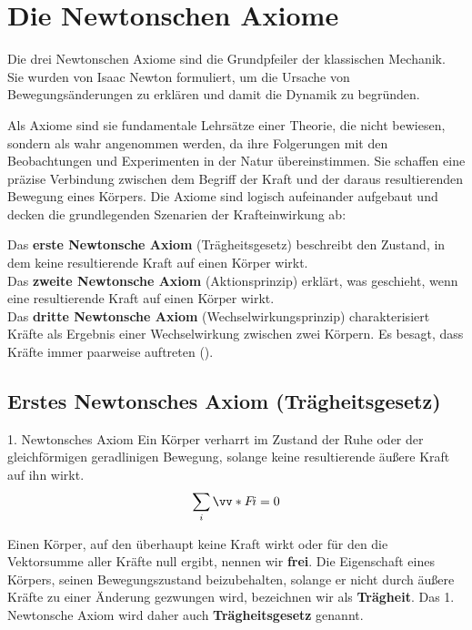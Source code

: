 \section{Die Newtonschen Axiome}\label{sec: newtonsche_axiome}
Die drei Newtonschen Axiome sind die Grundpfeiler der klassischen Mechanik. Sie wurden von Isaac Newton formuliert, um die Ursache von Bewegungsänderungen zu erklären und damit die Dynamik zu begründen. 

Als Axiome sind sie fundamentale Lehrsätze einer Theorie, die nicht bewiesen, sondern als wahr angenommen werden, da ihre Folgerungen mit den Beobachtungen und Experimenten in der Natur übereinstimmen. Sie schaffen eine präzise Verbindung zwischen dem Begriff der Kraft und der daraus resultierenden Bewegung eines Körpers. Die Axiome sind logisch aufeinander aufgebaut und decken die grundlegenden Szenarien der Krafteinwirkung ab:

Das \textbf{erste Newtonsche Axiom} (Trägheitsgesetz) beschreibt den Zustand, in dem keine resultierende Kraft auf einen Körper wirkt. \\
Das \textbf{zweite Newtonsche Axiom} (Aktionsprinzip) erklärt, was geschieht, wenn eine resultierende Kraft auf einen Körper wirkt. \\
Das \textbf{dritte Newtonsche Axiom} (Wechselwirkungsprinzip) charakterisiert Kräfte als Ergebnis einer Wechselwirkung zwischen zwei Körpern. Es besagt, dass Kräfte immer paarweise auftreten ().

\subsection{Erstes Newtonsches Axiom (Trägheitsgesetz)}\label{subsec: erstes_newtonsches_axiom}
\begin{importantbox}{1. Newtonsches Axiom}
    Ein Körper verharrt im Zustand der Ruhe oder der gleichförmigen geradlinigen Bewegung, solange keine resultierende äußere Kraft auf ihn wirkt.
    \begin{equation}\label{eq: erstes_newtonsches_axiom_trägheit}
        \sum_{i}\ivecS{F}{i} = 0
    \end{equation}
\end{importantbox}

Einen Körper, auf den überhaupt keine Kraft wirkt oder für den die Vektorsumme aller Kräfte null ergibt, nennen wir \textbf{frei}. Die Eigenschaft eines Körpers, seinen Bewegungszustand beizubehalten, solange er nicht durch äußere Kräfte zu einer Änderung gezwungen wird, bezeichnen wir als \textbf{Trägheit}. Das 1. Newtonsche Axiom wird daher auch \textbf{Trägheitsgesetz} genannt.

